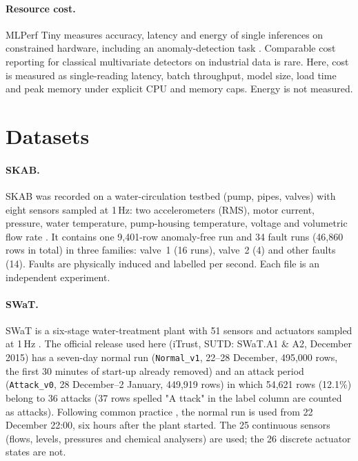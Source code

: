 \documentclass[11pt]{article}
\begin{document}
\paragraph{Resource cost.} MLPerf Tiny measures accuracy, latency and energy of
single inferences on constrained hardware, including an anomaly-detection task
\citep{banbury2021}. Comparable cost reporting for classical multivariate
detectors on industrial data is rare. Here, cost is measured as single-reading
latency, batch throughput, model size, load time and peak memory under explicit
CPU and memory caps. Energy is not measured.

\section{Datasets}
\label{sec:data}

\paragraph{SKAB.} SKAB was recorded on a water-circulation testbed (pump,
pipes, valves) with eight sensors sampled at 1\,Hz: two accelerometers (RMS),
motor current, pressure, water temperature, pump-housing temperature, voltage
and volumetric flow rate \citep{skab}. It contains one 9{,}401-row anomaly-free
run and 34 fault runs (46{,}860 rows in total) in three families: valve~1
(16 runs), valve~2 (4) and other faults (14). Faults are physically induced and
labelled per second. Each file is an independent experiment.

\paragraph{SWaT.} SWaT is a six-stage water-treatment plant with 51 sensors and
actuators sampled at 1\,Hz \citep{goh2016,mathur2016}. The official release used here
(iTrust, SUTD: SWaT.A1 \& A2, December 2015) has a seven-day normal run
(\texttt{Normal\_v1}, 22--28 December, 495{,}000 rows, the first 30 minutes of start-up
already removed) and an attack period (\texttt{Attack\_v0}, 28 December--2 January,
449{,}919 rows) in which 54{,}621 rows (12.1\%) belong to 36 attacks (37 rows spelled
"A ttack" in the label column are counted as attacks). Following common practice
\citep{li2019madgan}, the normal run is used from 22 December 22:00, six hours after the
plant started. The 25 continuous sensors (flows, levels, pressures and chemical
analysers) are used; the 26 discrete actuator states are not.
\end{document}
